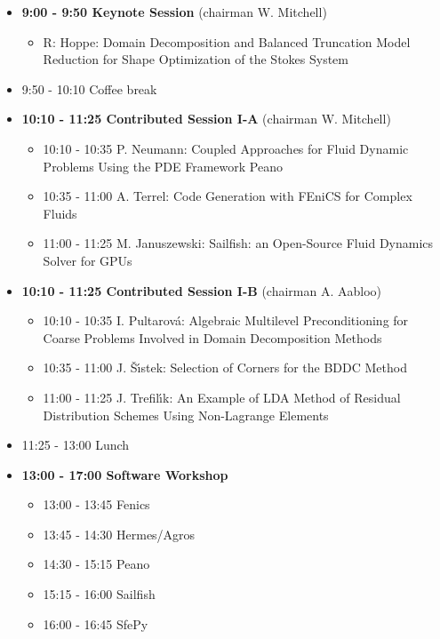 \documentclass[10pt, A4]{article}%
\begin{document}
\begin{itemize}    
  \item {\bf 9:00 - 9:50 Keynote Session} (chairman W. Mitchell) 
  \begin{itemize}
    \item R: Hoppe: Domain Decomposition and Balanced Truncation Model Reduction for Shape Optimization of the Stokes System
  \end{itemize}
  \item 9:50 - 10:10 Coffee break
  \item {\bf 10:10 - 11:25 Contributed Session I-A} (chairman W. Mitchell) 
  \begin{itemize}
    \item 10:10 - 10:35 P. Neumann: Coupled Approaches for Fluid Dynamic Problems Using the PDE Framework Peano
    \item 10:35 - 11:00 A. Terrel: Code Generation with FEniCS for Complex Fluids
    \item 11:00 - 11:25 M. Januszewski: Sailfish: an Open-Source Fluid Dynamics Solver for GPUs
  \end{itemize}
  \item {\bf 10:10 - 11:25 Contributed Session I-B} (chairman A. Aabloo) 
  \begin{itemize}
    \item 10:10 - 10:35 I. Pultarov\'a: Algebraic Multilevel Preconditioning for Coarse Problems
Involved in Domain Decomposition Methods
    \item 10:35 - 11:00 J. \v{S}\'{\i}stek: Selection of Corners for the BDDC Method
    \item 11:00 - 11:25 J. Trefil\'{\i}k: An Example of LDA Method of Residual Distribution Schemes 
Using Non-Lagrange Elements
  \end{itemize}
  \item 11:25 - 13:00 Lunch
  \item {\bf 13:00 - 17:00 Software Workshop}
  \begin{itemize}
    \item 13:00 - 13:45 Fenics
    \item 13:45 - 14:30 Hermes/Agros
    \item 14:30 - 15:15 Peano
    \item 15:15 - 16:00 Sailfish 
    \item 16:00 - 16:45 SfePy
  \end{itemize}
\end{itemize}

\newpage
\end{document}
